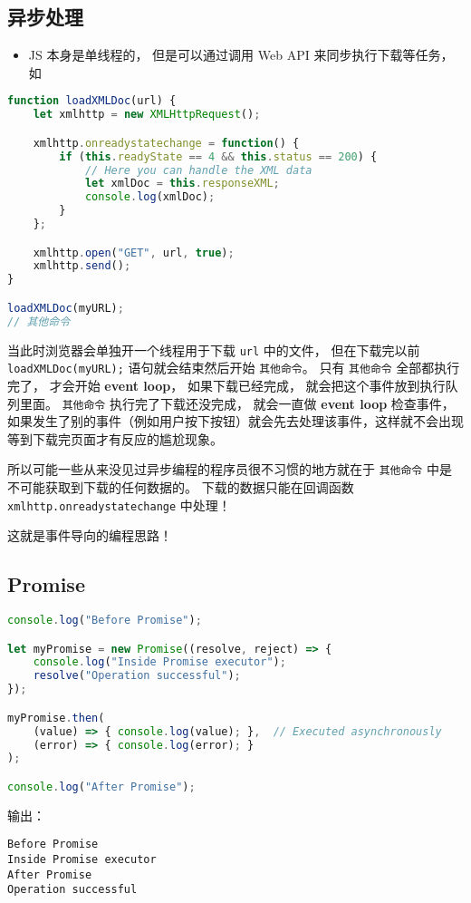 

\begin{issues}
\issueDraft
\end{issues}


\subsection{异步处理}
\begin{itemize}
\item JS 本身是单线程的， 但是可以通过调用 Web API 来同步执行下载等任务， 如
\end{itemize}
\begin{lstlisting}[language=js]
function loadXMLDoc(url) {
    let xmlhttp = new XMLHttpRequest();

    xmlhttp.onreadystatechange = function() {
        if (this.readyState == 4 && this.status == 200) {
            // Here you can handle the XML data
            let xmlDoc = this.responseXML;
            console.log(xmlDoc);
        }
    };

    xmlhttp.open("GET", url, true);
    xmlhttp.send();
}

loadXMLDoc(myURL);
// 其他命令
\end{lstlisting}
当此时浏览器会单独开一个线程用于下载 \verb`url` 中的文件， 但在下载完以前 \verb`loadXMLDoc(myURL);` 语句就会结束然后开始 \verb`其他命令`。 只有 \verb`其他命令` 全部都执行完了， 才会开始 \textbf{event loop}， 如果下载已经完成， 就会把这个事件放到执行队列里面。 \verb`其他命令` 执行完了下载还没完成， 就会一直做 \textbf{event loop} 检查事件， 如果发生了别的事件（例如用户按下按钮）就会先去处理该事件，这样就不会出现等到下载完页面才有反应的尴尬现象。

所以可能一些从来没见过异步编程的程序员很不习惯的地方就在于 \verb`其他命令` 中是不可能获取到下载的任何数据的。 下载的数据只能在回调函数 \verb`xmlhttp.onreadystatechange` 中处理！

这就是事件导向的编程思路！

\subsection{Promise}
\begin{lstlisting}[language=js]
console.log("Before Promise");

let myPromise = new Promise((resolve, reject) => {
    console.log("Inside Promise executor");
    resolve("Operation successful");
});

myPromise.then(
    (value) => { console.log(value); },  // Executed asynchronously
    (error) => { console.log(error); }
);

console.log("After Promise");
\end{lstlisting}
输出：
\begin{lstlisting}[language=none]
Before Promise
Inside Promise executor
After Promise
Operation successful
\end{lstlisting}

